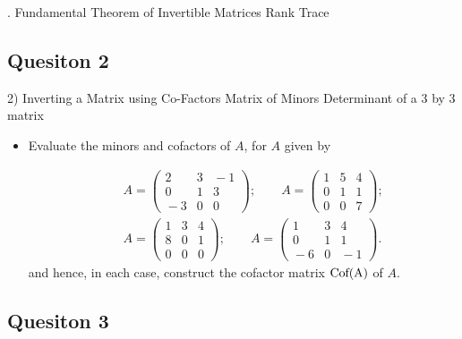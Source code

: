 \documentclass[12pt,a4paper]{article}
\begin{document}

.
Fundamental Theorem of Invertible Matrices
Rank
Trace

\subsection*{Quesiton 2}

2) Inverting a Matrix using Co-Factors
	Matrix of Minors
	Determinant of a 3 by 3 matrix

\begin{itemize}	
\item Evaluate the  minors and cofactors of $A$, for $A$ given by

\begin{eqnarray*}
& &\!\!\!\!\!\!\!\!A=\left( \begin{array}{ccc}
2 & 3 & \!\!\!\!-1\\
0 & 1 & 3\\
\!\!\!\!-3 & 0 & 0\end{array}\right);\qquad A=\left( \begin{array}{ccc}
1 & 5 & 4\\
0 & 1 & 1\\
0 & 0 & 7
\end{array} \right);\\
& &\!\!\!\!\!\!\!\!A=\left( \begin{array}{ccc}
1 & 3 & 4\\
8 & 0 & 1\\
0 & 0 & 0\end{array}\right);\qquad A=\left( \begin{array}{ccc}
1 & 3 & 4\\
0 & 1 & 1\\
\!\!\!\!-6 & 0 & \!\!\!\!-1
\end{array} \right).
\end{eqnarray*}
and hence, in each case, construct the cofactor matrix $\textnormal{Cof(A)}$ of $A$.
\end{itemize}

\subsection*{Quesiton 3}
\end{document}
